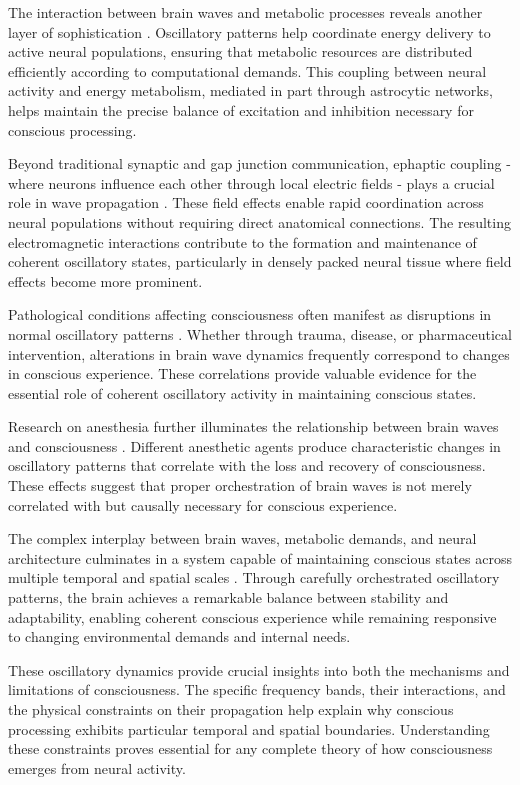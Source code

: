 \begin{refsection}
The interaction between brain waves and metabolic processes reveals another layer of sophistication \cite{Nyhus2010}. Oscillatory patterns help coordinate energy delivery to active neural populations, ensuring that metabolic resources are distributed efficiently according to computational demands. This coupling between neural activity and energy metabolism, mediated in part through astrocytic networks, helps maintain the precise balance of excitation and inhibition necessary for conscious processing.

Beyond traditional synaptic and gap junction communication, ephaptic coupling - where neurons influence each other through local electric fields - plays a crucial role in wave propagation \cite{Buzsaki2006}. These field effects enable rapid coordination across neural populations without requiring direct anatomical connections. The resulting electromagnetic interactions contribute to the formation and maintenance of coherent oscillatory states, particularly in densely packed neural tissue where field effects become more prominent.

Pathological conditions affecting consciousness often manifest as disruptions in normal oscillatory patterns \cite{Uhlhaas2010}. Whether through trauma, disease, or pharmaceutical intervention, alterations in brain wave dynamics frequently correspond to changes in conscious experience. These correlations provide valuable evidence for the essential role of coherent oscillatory activity in maintaining conscious states.

Research on anesthesia further illuminates the relationship between brain waves and consciousness \cite{Kahana2001}. Different anesthetic agents produce characteristic changes in oscillatory patterns that correlate with the loss and recovery of consciousness. These effects suggest that proper orchestration of brain waves is not merely correlated with but causally necessary for conscious experience.

The complex interplay between brain waves, metabolic demands, and neural architecture culminates in a system capable of maintaining conscious states across multiple temporal and spatial scales \cite{Varela2001}. Through carefully orchestrated oscillatory patterns, the brain achieves a remarkable balance between stability and adaptability, enabling coherent conscious experience while remaining responsive to changing environmental demands and internal needs.

These oscillatory dynamics provide crucial insights into both the mechanisms and limitations of consciousness. The specific frequency bands, their interactions, and the physical constraints on their propagation help explain why conscious processing exhibits particular temporal and spatial boundaries. Understanding these constraints proves essential for any complete theory of how consciousness emerges from neural activity.


\end{refsection}

